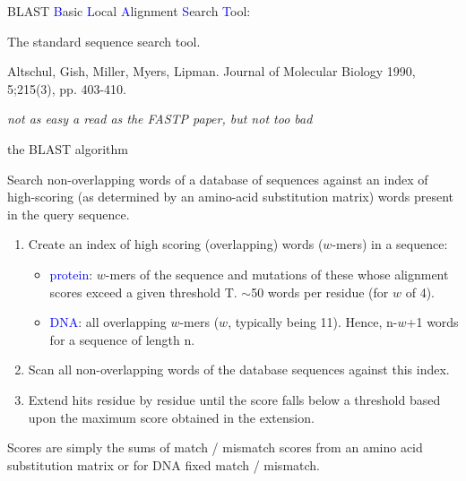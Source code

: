 \documentclass[pdf]{beamer}
\begin{document}
\begin{frame}{BLAST}
  \textcolor{blue}{B}asic \textcolor{blue}{L}ocal \textcolor{blue}{A}lignment
  \textcolor{blue}{S}earch \textcolor{blue}{T}ool:

  The standard sequence search tool.

  Altschul, Gish, Miller, Myers, Lipman. Journal of Molecular Biology 1990,
  5;215(3), pp. 403-410.

  \emph{not as easy a read as the FASTP paper, but not too bad}
\end{frame}

\begin{frame}{the BLAST algorithm}

  {\small
  Search non-overlapping words of a database of sequences against an index of
  high-scoring (as determined by an amino-acid substitution matrix) words
  present in the query sequence.

  \begin{enumerate}
  \item Create an index of high scoring (overlapping) words ($w$-mers) in a sequence:
    \begin{itemize}
      \item \textcolor{blue}{protein}: $w$-mers of the sequence and mutations of these whose
        alignment scores exceed a given threshold T. $\sim$50 words per
        residue (for $w$ of 4).
      \item \textcolor{blue}{DNA}: all overlapping $w$-mers ($w$, typically being 11). Hence,
        n-$w$+1 words for a sequence of length n.
    \end{itemize}
  \item Scan all non-overlapping words of the database sequences against this
    index.
  \item Extend hits residue by residue until the score falls below a threshold
    based upon the maximum score obtained in the extension.
  \end{enumerate}
  
  Scores are simply the sums of match / mismatch scores from an amino acid
  substitution matrix or for DNA fixed match / mismatch. 
  }
\end{frame}
\end{document}
